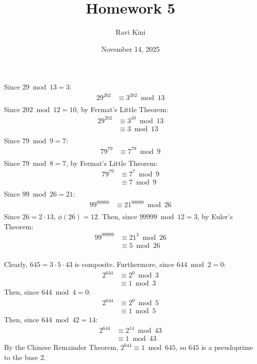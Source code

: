 \documentclass{article}
\title{Homework 5}
\author{Ravi Kini}
\date{November 14, 2025}
\begin{document}
\maketitle

\problem{}
Since $29 \bmod 13 = 3$:
\begin{align*}
    29^{202} & \equiv 3^{202} \bmod 13 \\
\end{align*}
Since $202 \bmod 12 = 10$, by Fermat's Little Theorem:
\begin{align*}
    29^{202} & \equiv 3^{10} \bmod 13 \\
    & \equiv 3 \bmod 13 \\
\end{align*}
Since $79 \bmod 9 = 7$:
\begin{align*}
    79^{79} & \equiv 7^{79} \bmod 9 \\
\end{align*}
Since $79 \bmod 8 = 7$, by Fermat's Little Theorem:
\begin{align*}
    79^{79} & \equiv 7^7 \bmod 9 \\
    & \equiv 7 \bmod 9 \\
\end{align*}
Since $99 \bmod 26 = 21$:
\begin{align*}
    99^{99999} & \equiv 21^{99999} \bmod 26 \\
\end{align*}
Since $26 = 2 \cdot 13$, $\phi(26) = 12$. Then, since $99999 \bmod 12 = 3$, by Euler's Theorem:
\begin{align*}
    99^{99999} & \equiv 21^3 \bmod 26 \\
    & \equiv 5 \bmod 26 \\
\end{align*}

\clearpage
\problem{}
Clearly, $645 = 3 \cdot 5 \cdot 43$ is composite. Furthermore, since $644 \bmod 2 = 0$:
\begin{align*}
    2^{644} & \equiv 2^0 \bmod 3 \\
    & \equiv 1 \bmod 3
\end{align*}
Then, since $644 \bmod 4 = 0$:
\begin{align*}
    2^{644} & \equiv 2^0 \bmod 5 \\
    & \equiv 1 \bmod 5
\end{align*}
Then, since $644 \bmod 42 = 14$:
\begin{align*}
    2^{644} & \equiv 2^{14} \bmod 43 \\
    & \equiv 1 \bmod 43
\end{align*}
By the Chinese Remainder Theorem, $2^{644} \equiv 1 \bmod 645$, so $645$ is a pseudoprime to the base $2$.
\end{document}

